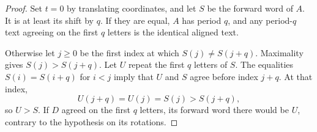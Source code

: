 \begin{proof}
Set $t=0$ by translating coordinates, and let $S$ be the forward word of $A$. It is at least its shift by $q$. If they are equal, $A$ has period $q$, and any period-$q$ text agreeing on the first $q$ letters is the identical aligned text.

Otherwise let $j\ge0$ be the first index at which $S(j)\ne S(j+q)$. Maximality gives $S(j)>S(j+q)$. Let $U$ repeat the first $q$ letters of $S$. The equalities $S(i)=S(i+q)$ for $i<j$ imply that $U$ and $S$ agree before index $j+q$. At that index,
\[
U(j+q)=U(j)=S(j)>S(j+q),
\]
so $U>S$. If $D$ agreed on the first $q$ letters, its forward word there would be $U$, contrary to the hypothesis on its rotations.
\end{proof}

